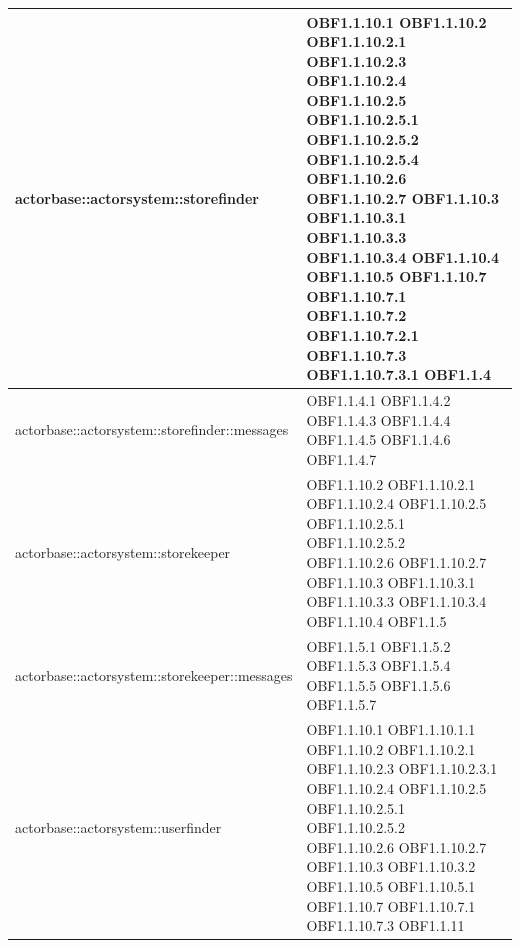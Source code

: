 \documentclass{scalatekids-article}
\begin{document}
\begin{longtable}[H]{|p{9cm}|p{8cm}|}
actorbase::actorsystem::storefinder & \multiLineCell[t]{OBF1.1.10.1 OBF1.1.10.2\\OBF1.1.10.2.1 OBF1.1.10.2.3\\OBF1.1.10.2.4 OBF1.1.10.2.5\\OBF1.1.10.2.5.1 OBF1.1.10.2.5.2\\OBF1.1.10.2.5.4 OBF1.1.10.2.6\\OBF1.1.10.2.7 OBF1.1.10.3\\OBF1.1.10.3.1 OBF1.1.10.3.3\\OBF1.1.10.3.4 OBF1.1.10.4\\OBF1.1.10.5 OBF1.1.10.7\\OBF1.1.10.7.1 OBF1.1.10.7.2\\OBF1.1.10.7.2.1 OBF1.1.10.7.3\\OBF1.1.10.7.3.1 OBF1.1.4\\}\\
\hline
actorbase::actorsystem::storefinder::messages & \multiLineCell[t]{OBF1.1.4.1 OBF1.1.4.2\\OBF1.1.4.3 OBF1.1.4.4\\OBF1.1.4.5 OBF1.1.4.6\\OBF1.1.4.7}\\
\hline
actorbase::actorsystem::storekeeper & \multiLineCell[t]{OBF1.1.10.2 OBF1.1.10.2.1\\OBF1.1.10.2.4 OBF1.1.10.2.5\\OBF1.1.10.2.5.1 OBF1.1.10.2.5.2\\OBF1.1.10.2.6 OBF1.1.10.2.7\\OBF1.1.10.3 OBF1.1.10.3.1\\OBF1.1.10.3.3 OBF1.1.10.3.4\\OBF1.1.10.4 OBF1.1.5\\}\\
\hline
actorbase::actorsystem::storekeeper::messages & \multiLineCell[t]{OBF1.1.5.1 OBF1.1.5.2\\OBF1.1.5.3 OBF1.1.5.4\\OBF1.1.5.5 OBF1.1.5.6\\OBF1.1.5.7}\\
\hline
actorbase::actorsystem::userfinder & \multiLineCell[t]{OBF1.1.10.1 OBF1.1.10.1.1\\OBF1.1.10.2 OBF1.1.10.2.1\\OBF1.1.10.2.3 OBF1.1.10.2.3.1\\OBF1.1.10.2.4 OBF1.1.10.2.5\\OBF1.1.10.2.5.1 OBF1.1.10.2.5.2\\OBF1.1.10.2.6 OBF1.1.10.2.7\\OBF1.1.10.3 OBF1.1.10.3.2\\OBF1.1.10.5 OBF1.1.10.5.1\\OBF1.1.10.7 OBF1.1.10.7.1\\OBF1.1.10.7.3 OBF1.1.11\\}\\

\end{longtable}
\end{document}
